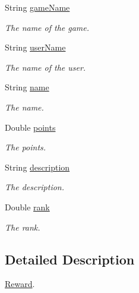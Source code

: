 \begin{DoxyCompactItemize}
\item 
String \hyperlink{classcom_1_1shephertz_1_1app42_1_1paas_1_1sdk_1_1csharp_1_1reward_1_1_reward_a829138697d56a2827f29e7df7e8ec610}{game\+Name}
\begin{DoxyCompactList}\small\item\em The name of the game. \end{DoxyCompactList}\item 
String \hyperlink{classcom_1_1shephertz_1_1app42_1_1paas_1_1sdk_1_1csharp_1_1reward_1_1_reward_a5c201112a05fd475bfbf778ae39fedd4}{user\+Name}
\begin{DoxyCompactList}\small\item\em The name of the user. \end{DoxyCompactList}\item 
String \hyperlink{classcom_1_1shephertz_1_1app42_1_1paas_1_1sdk_1_1csharp_1_1reward_1_1_reward_a0e092b67d4fd4e7c458733cc1b1e38d1}{name}
\begin{DoxyCompactList}\small\item\em The name. \end{DoxyCompactList}\item 
Double \hyperlink{classcom_1_1shephertz_1_1app42_1_1paas_1_1sdk_1_1csharp_1_1reward_1_1_reward_ac5dc67f0962a577b371e98f76b3ea34b}{points}
\begin{DoxyCompactList}\small\item\em The points. \end{DoxyCompactList}\item 
String \hyperlink{classcom_1_1shephertz_1_1app42_1_1paas_1_1sdk_1_1csharp_1_1reward_1_1_reward_af47d9b6832d16cea33fbb19207ad0c5a}{description}
\begin{DoxyCompactList}\small\item\em The description. \end{DoxyCompactList}\item 
Double \hyperlink{classcom_1_1shephertz_1_1app42_1_1paas_1_1sdk_1_1csharp_1_1reward_1_1_reward_a9b718d26725b1e122f1929d09dea86b2}{rank}
\begin{DoxyCompactList}\small\item\em The rank. \end{DoxyCompactList}\end{DoxyCompactItemize}


\subsection{Detailed Description}
\hyperlink{classcom_1_1shephertz_1_1app42_1_1paas_1_1sdk_1_1csharp_1_1reward_1_1_reward}{Reward}. 



